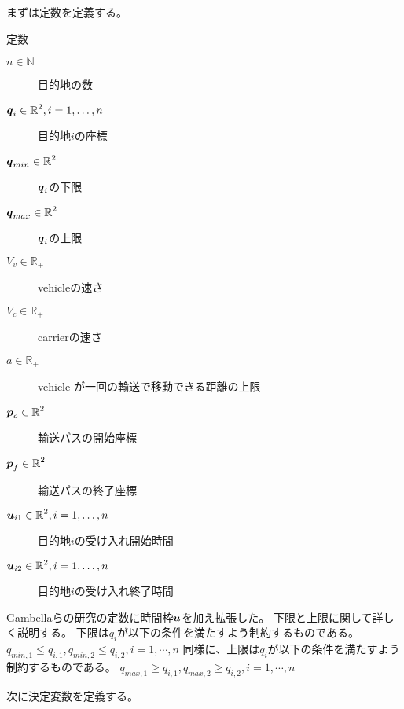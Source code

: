 \documentclass[11pt,a4paper,dvipdfmx,titlepage,uplatex]{jsarticle}
\theoremstyle{mystyle}
\newcommand{\0}{\mathbf{0}}
\def\p{\mbox{\boldmath $p$}}
\def\q{\mbox{\boldmath $q$}}
\def\u{\mbox{\boldmath $u$}}
\def\Real{\mbox{$\mathbb{R}$}}
\begin{document}
	まずは定数を定義する。
	\begin{itembox}[l]{定数}
		\begin{description}
			\item[$n \in \mathbb{N}$]目的地の数
			\item[$\q_i \in \Real^2, i=1,\dots,n$]目的地$i$の座標
			\item[$\q_{min}\in \Real^2$] $\q_i$の下限
			\item[$\q_{max}\in \Real^2$]  $\q_i$の上限
			\item[$V_v\in \Real_+$] vehicleの速さ
			\item[$V_c\in \Real_+$] carrierの速さ
			\item[$a\in \Real_+$] vehicle が一回の輸送で移動できる距離の上限
			\item[$\p_o\in \Real^2$]輸送パスの開始座標
			\item[$\p_f\in \Real^2$]輸送パスの終了座標
			\item[$\u_{i1}\in \Real^2, i=1,\dots,n$] 目的地$i$の受け入れ開始時間
			\item[$\u_{i2}\in \Real^2, i=1,\dots,n$] 目的地$i$の受け入れ終了時間
		\end{description}
		\label{tb:constant}
	\end{itembox}
	Gambellaらの研究の定数に時間枠$\u$を加え拡張した。
	下限と上限に関して詳しく説明する。
	下限は$q_i$が以下の条件を満たすよう制約するものである。
	$q_{min,1}\leq q_{i,1}, q_{min,2}\leq q_{i,2}, i = 1,\cdots,n$
	同様に、上限は$q_i$が以下の条件を満たすよう制約するものである。
	$q_{max,1}\geq q_{i,1}, q_{max,2}\geq q_{i,2}, i = 1,\cdots,n$
	
	次に決定変数を定義する。
	
\end{document}
